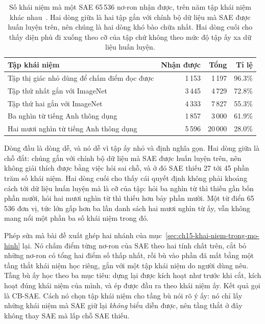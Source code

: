 \begin{table}[htbp]
  \centering
  \caption{Số khái niệm mà một SAE 65\,536 nơ-ron nhận được, trên năm tập khái
  niệm khác nhau~\autocite{p32cbmsae}. Hai dòng giữa là hai tập gắn với chính
  bộ dữ liệu mà SAE được huấn luyện trên, nên chúng là hai dòng khó bào chữa
  nhất. Hai dòng cuối cho thấy diện phủ đi xuống theo cỡ của tập chứ không theo
  mức độ tập ấy xa dữ liệu huấn luyện.}
  \label{tab:ch15-dien-khai-niem}
  \begin{tabular}{@{}lrrr@{}}
    \toprule
    Tập khái niệm & Nhận được & Tổng & Tỉ lệ \\
    \midrule
    Tập thị giác nhỏ dùng để chấm điểm đọc được & 1\,153 & 1\,197 & 96.3\% \\
    \addlinespace
    Tập thứ nhất gắn với ImageNet & 3\,445 & 4\,729 & 72.8\% \\
    Tập thứ hai gắn với ImageNet & 4\,333 & 7\,827 & 55.3\% \\
    \addlinespace
    Ba nghìn từ tiếng Anh thông dụng & 1\,857 & 3\,000 & 61.9\% \\
    Hai mươi nghìn từ tiếng Anh thông dụng & 5\,596 & 20\,000 & 28.0\% \\
    \bottomrule
  \end{tabular}
\end{table}

Dòng đầu là dòng dễ, và nó dễ vì tập ấy nhỏ và định nghĩa gọn. Hai dòng giữa là
chỗ đắt: chúng gắn với chính bộ dữ liệu mà SAE được huấn luyện trên, nên không
giải thích được bằng việc hỏi sai chỗ, và ở đó SAE thiếu 27 tới 45 phần trăm số
khái niệm. Hai dòng cuối cho thấy cái quyết định không phải khoảng cách tới dữ
liệu huấn luyện mà là cỡ của tập: hỏi ba nghìn từ thì thiếu gần bốn phần mười,
hỏi hai mươi nghìn từ thì thiếu hơn bảy phần mười. Một từ điển 65\,536 đơn vị,
tức lớn gấp hơn ba lần danh sách hai mươi nghìn từ ấy, vẫn không mang nổi một
phần ba số khái niệm trong đó.

%
Phép sửa mà bài đề xuất ghép hai nhánh của mục~\ref{sec:ch15-khai-niem-trong-mo-hinh}
lại. Nó chấm điểm từng nơ-ron của SAE theo hai tính chất trên, cắt bỏ những
nơ-ron có tổng hai điểm số thấp nhất, rồi bù vào phần đã mất bằng một tầng thắt
khái niệm học riêng, gắn với một tập khái niệm do người dùng nêu. Tầng bù ấy học
theo ba mục tiêu: dựng lại được kích hoạt như trước khi cắt, kích hoạt đúng
khái niệm của mình, và ép được đầu ra theo khái niệm ấy. Kết quả gọi là CB-SAE.
Cách nó chọn tập khái niệm cho tầng bù nói rõ ý ấy: nó chỉ lấy những khái
niệm mà SAE giữ lại \emph{không} biểu diễn được, nên tầng thắt ở đây không thay
SAE mà lấp chỗ SAE thiếu.

